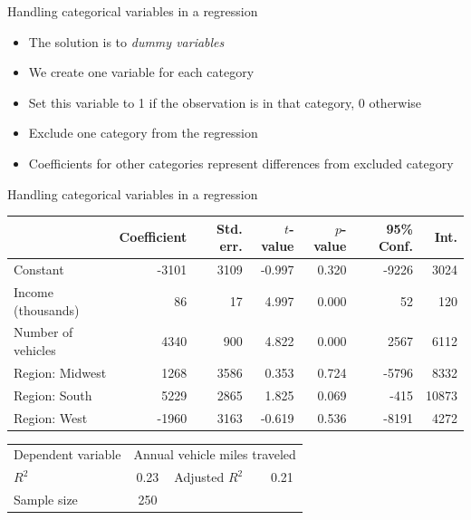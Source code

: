\begin{frame}{Handling categorical variables in a regression}
  \begin{itemize}
    \item The solution is to \emph{dummy variables}
    \item We create one variable for each category
    \item Set this variable to 1 if the observation is in that category, 0 otherwise
    \item Exclude one category from the regression
    \item Coefficients for other categories represent differences from excluded category
  \end{itemize}
\end{frame}

\begin{frame}{Handling categorical variables in a regression}
  \small
  \begin{tabular}{lrrrrrr}
  \toprule
  {} &  Coefficient &  Std. err. &  $t$-value &  $p$-value &  95\% Conf. &   Int. \\
  \midrule
  Constant           &        -3101 &       3109 &     -0.997 &      0.320 &      -9226 &   3024 \\
  Income (thousands) &           86 &         17 &      4.997 &      0.000 &         52 &    120 \\
  Number of vehicles &         4340 &        900 &      4.822 &      0.000 &       2567 &   6112 \\
  Region: Midwest    &         1268 &       3586 &      0.353 &      0.724 &      -5796 &   8332 \\
  Region: South      &         5229 &       2865 &      1.825 &      0.069 &       -415 &  10873 \\
  Region: West       &        -1960 &       3163 &     -0.619 &      0.536 &      -8191 &   4272 \\
  \bottomrule
  \end{tabular}
  \begin{tabular}{lclc}
  Dependent variable & \multicolumn{3}{l}{Annual vehicle miles traveled} \\
  $R^2$ & 0.23 & Adjusted $R^2$ & 0.21 \\
  Sample size & 250 && \\
  \end{tabular}\\
  \tiny\citenhts
\end{frame}

